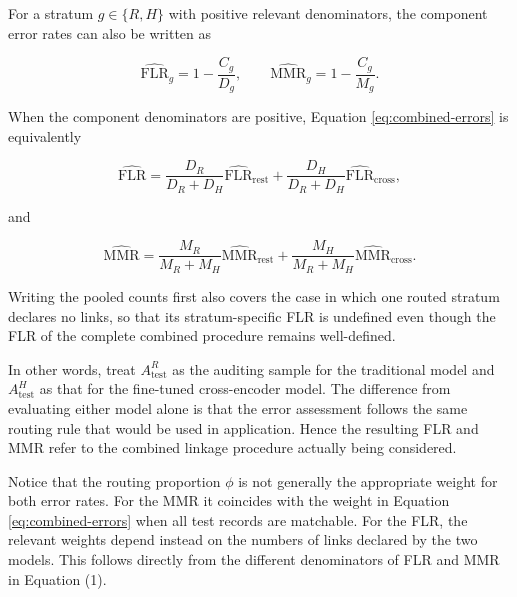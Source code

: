 
For a stratum $g\in\{R,H\}$ with positive relevant denominators, the component
error rates can also be written as

\[
\widehat{\mathrm{FLR}}_g
=
1-\frac{C_g}{D_g},
\qquad
\widehat{\mathrm{MMR}}_g
=
1-\frac{C_g}{M_g}.
\]

When the component denominators are positive, Equation
\eqref{eq:combined-errors} is equivalently

\[
\widehat{\mathrm{FLR}}
=
\frac{D_R}{D_R+D_H}
\widehat{\mathrm{FLR}}_{\mathrm{rest}}
+
\frac{D_H}{D_R+D_H}
\widehat{\mathrm{FLR}}_{\mathrm{cross}},
\]

and

\[
\widehat{\mathrm{MMR}}
=
\frac{M_R}{M_R+M_H}
\widehat{\mathrm{MMR}}_{\mathrm{rest}}
+
\frac{M_H}{M_R+M_H}
\widehat{\mathrm{MMR}}_{\mathrm{cross}}.
\]

Writing the pooled counts first also covers the case in which one routed stratum
declares no links, so that its stratum-specific FLR is undefined even though the
FLR of the complete combined procedure remains well-defined.

In other words, treat $A_{\mathrm{test}}^R$ as the auditing sample for the traditional
model and $A_{\mathrm{test}}^H$ as that for the fine-tuned cross-encoder model. The
difference from evaluating either model alone is that the error assessment follows the same
routing rule that would be used in application. Hence the resulting FLR and MMR refer to
the combined linkage procedure actually being considered.

Notice that the routing proportion $\phi$ is not generally the appropriate weight for both
error rates. For the MMR it coincides with the weight in
Equation \eqref{eq:combined-errors} when all test records are matchable. For the FLR,
the relevant weights depend instead on the numbers of links declared by the two models.
This follows directly from the different denominators of FLR and MMR in Equation (1).

